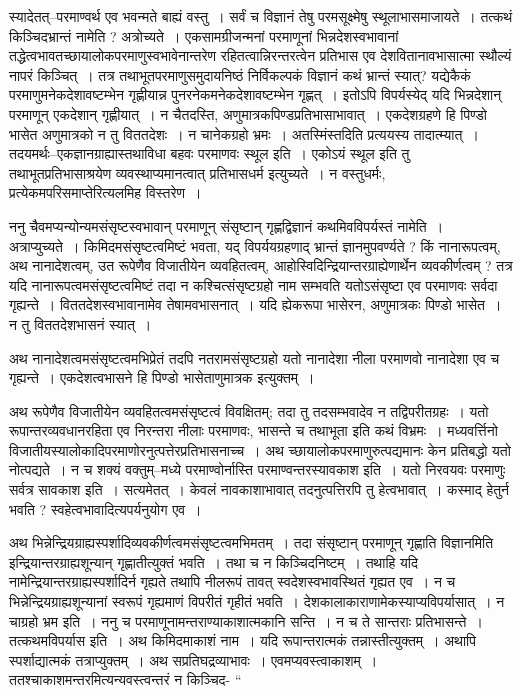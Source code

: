\documentclass[article,12pt,a4paper]{memoir}
\begin{document}
	  \pstart स्यादेतत्--परमाण्वर्थ एव भवन्मते बाह्यं वस्तु । सर्वं च विज्ञानं तेषु परमसूक्ष्मेषु  \leavevmode{} स्थूलाभासमाजायते । तत्कथं किञ्चिदभ्रान्तं नामेति ? अत्रोच्यते । एकसामग्रीजन्मनां परमाणूनां भिन्नदेशस्वभावानां तद्धेत्वभावतच्छायालोकपरमाणुस्वभावेनान्तरेण रहितत्वान्निरन्तरत्वेन प्रतिभास एव देशवितानावभासात्मा स्थौल्यं नापरं किञ्चित् । तत्र तथाभूतपरमाणुसमुदायनिष्ठं निर्विकल्पकं विज्ञानं कथं भ्रान्तं स्यात्? यद्येकैकं परमाणुमनेकदेशावष्टम्भेन गृह्णीयान्न पुनरनेकमनेकदेशावष्टम्भेन गृह्णत् । इतोऽपि विपर्यस्येद् यदि भिन्नदेशान् परमाणून् एकदेशान् गृह्णीयात् । न चैतदस्ति, अणुमात्रकपिण्डप्रतिभासाभावात् । एकदेशग्रहणे हि पिण्डो भासेत अणुमात्रको न तु विततदेशः । न चानेकग्रहो भ्रमः । अतस्मिंस्तदिति प्रत्ययस्य तादात्म्यात् । तदयमर्थः--एकज्ञानग्राह्यास्तथाविधा बहवः परमाणवः स्थूल इति । एकोऽयं स्थूल इति तु तथाभूतप्रतिभासाश्रयेण व्यवस्थाप्यमानत्वात् प्रतिभासधर्म इत्युच्यते । न वस्तुधर्मः, प्रत्येकमपरिसमाप्तेरित्यलमिह विस्तरेण ।
	\pend
      

	  \pstart ननु चैवमप्यन्योन्यमसंसृष्टस्वभावान् परमाणून् संसृष्टान् गृह्णद्विज्ञानं कथमिवविपर्यस्तं नामेति । अत्राप्युच्यते । किमिदमसंसृष्टत्वमिष्टं भवता, यद् विपर्ययग्रहणाद् भ्रान्तं ज्ञानमुपवर्ण्यते ? किं नानारूपत्वम्, अथ नानादेशत्वम्, उत रूपेणैव विजातीयेन व्यवहितत्वम्, आहोस्विदिन्द्रियान्तरग्राह्येणार्थेन व्यवकीर्णत्वम् ? तत्र यदि नानारूपत्वमसंसृष्टत्वमिष्टं तदा न कश्चित्संसृष्टग्रहो नाम सम्भवति यतोऽसंसृष्टा एव परमाणवः सर्वदा गृह्यन्ते । विततदेशस्वभावानामेव तेषामवभासनात् । यदि ह्येकरूपा भासेरन, अणुमात्रकः पिण्डो भासेत । न तु विततदेशभासनं स्यात् ।
	\pend
      

	  \pstart अथ नानादेशत्वमसंसृष्टत्वमभिप्रेतं तदपि नतरामसंसृष्टग्रहो यतो नानादेशा नीला परमाणवो नानादेशा एव च गृह्यन्ते । एकदेशत्वभासने हि पिण्डो भासेताणुमात्रक इत्युक्तम् ।
	\pend
      

	  \pstart अथ रूपेणैव विजातीयेन व्यवहितत्वमसंसृष्टत्वं विवक्षितम्; तदा तु तदसम्भवादेव न तद्विपरीतग्रहः । यतो रूपान्तरव्यवधानरहिता एव निरन्तरा नीलाः परमाणवः, भासन्ते च तथाभूता इति कथं विभ्रमः । मध्यवर्त्तिनो विजातीयस्यालोकादिपरमाणोरनुत्पत्तेरप्रतिभासनाच्च । अथ च्छायालोकपरमाणुरुत्पद्यमानः केन प्रतिबद्धो यतो नोत्पद्यते । न च शक्यं वक्तुम्--मध्ये परमाण्वोर्नास्ति परमाण्वन्तरस्यावकाश इति । यतो निरवयवः परमाणुः सर्वत्र सावकाश इति । सत्यमेतत् । केवलं नावकाशाभावात् तदनुत्पत्तिरपि तु हेत्वभावात् । कस्माद् हेतुर्न भवति ? स्वहे\leavevmode{}त्वभावादित्यपर्यनुयोग एव ।
	\pend
      

	  \pstart अथ भिन्नेन्द्रियग्राह्यस्पर्शादिव्यवकीर्णत्वमसंसृष्टत्वमभिमतम् । तदा संसृष्टान् परमाणून् गृह्णाति विज्ञानमिति इन्द्रियान्तरग्राह्यशून्यान् गृह्णातीत्युक्तं भवति । तथा च न किञ्चिदनिष्टम् । तथाहि यदि नामेन्द्रियान्तरग्राह्यस्पर्शादिर्न गृह्यते तथापि नीलरूपं तावत् स्वदेशस्वभावस्थितं गृह्यत एव । न च भिन्नेन्द्रियग्राह्यशून्यानां स्वरूपं गृह्यमाणं विपरीतं गृहीतं भवति । देशकालाकाराणामेकस्याप्यविपर्यासात् । न चाग्रहो भ्रम इति । ननु च परमाणूनामन्तराण्याकाशात्मकानि सन्ति । न च ते सान्तराः प्रतिभासन्ते । तत्कथमविपर्यास इति । अथ किमिदमाकाशं नाम । यदि रूपान्तरात्मकं तन्नास्तीत्युक्तम् । अथापि स्पर्शाद्यात्मकं तत्राप्युक्तम् । अथ सप्रतिघद्रव्याभावः । एवमप्यवस्त्वाकाशम् । ततश्चाकाशमन्तरमित्यन्यवस्त्वन्तरं न किञ्चिद- \leavevmode{} “
	  
\end{document}
